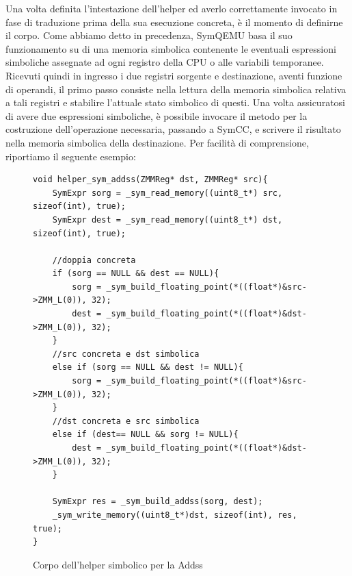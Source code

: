 \documentclass[Lau, oneside]{sapthesis}%
\begin{document}
\newpage
Una volta definita l'intestazione dell'helper ed averlo correttamente invocato in fase di traduzione prima della sua esecuzione concreta, è il momento di definirne il corpo.
\newline \newline
Come abbiamo detto in precedenza, SymQEMU basa il suo funzionamento su di una memoria simbolica contenente le eventuali espressioni simboliche assegnate ad ogni registro della CPU o alle variabili temporanee.
\newline
Ricevuti quindi in ingresso i due registri sorgente e destinazione, aventi funzione di operandi, il primo passo consiste nella lettura della memoria simbolica relativa a tali registri e stabilire l'attuale stato simbolico di questi.
\newline
Una volta assicuratosi di avere due espressioni simboliche, è possibile invocare il metodo per la costruzione dell'operazione necessaria, passando a SymCC, e scrivere il risultato nella memoria simbolica della destinazione.
\newline \newline \newline
Per facilità di comprensione, riportiamo il seguente esempio:
\begin{figure}[h]
\begin{lstlisting}[xleftmargin=0\textwidth, language=SymQEMU, basicstyle=\footnotesize]
void helper_sym_addss(ZMMReg* dst, ZMMReg* src){
    SymExpr sorg = _sym_read_memory((uint8_t*) src, sizeof(int), true);
    SymExpr dest = _sym_read_memory((uint8_t*) dst, sizeof(int), true);
    
    //doppia concreta
    if (sorg == NULL && dest == NULL){
        sorg = _sym_build_floating_point(*((float*)&src->ZMM_L(0)), 32);
        dest = _sym_build_floating_point(*((float*)&dst->ZMM_L(0)), 32);
    }
    //src concreta e dst simbolica
    else if (sorg == NULL && dest != NULL){
        sorg = _sym_build_floating_point(*((float*)&src->ZMM_L(0)), 32);
    }
    //dst concreta e src simbolica
    else if (dest== NULL && sorg != NULL){
        dest = _sym_build_floating_point(*((float*)&dst->ZMM_L(0)), 32);
    }

    SymExpr res = _sym_build_addss(sorg, dest);
    _sym_write_memory((uint8_t*)dst, sizeof(int), res, true);
}
\end{lstlisting}
    \caption{Corpo dell'helper simbolico per la Addss}
    \label{fig:corpo_sym_addss}
\end{figure}
\ \\
\end{document}
